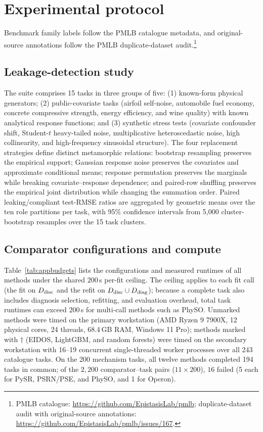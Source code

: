 \section{Experimental protocol}\label{app:protocol}

Benchmark family labels follow the PMLB catalogue metadata, and original-source annotations follow the PMLB duplicate-dataset audit.\footnote{PMLB catalogue: \url{https://github.com/EpistasisLab/pmlb}; duplicate-dataset audit with original-source annotations: \url{https://github.com/EpistasisLab/pmlb/issues/167}.}

\subsection{Leakage-detection study}\label{app:leakage}

The suite comprises 15 tasks in three groups of five: (1) known-form physical generators; (2) public-covariate tasks (airfoil self-noise, automobile fuel economy, concrete compressive strength, energy efficiency, and wine quality) with known analytical response functions; and (3) synthetic stress tests (covariate confounder shift, Student-\(t\) heavy-tailed noise, multiplicative heteroscedastic noise, high collinearity, and high-frequency sinusoidal structure). The four replacement strategies define distinct metamorphic relations: bootstrap resampling preserves the empirical support; Gaussian response noise preserves the covariates and approximate conditional means; response permutation preserves the marginals while breaking covariate--response dependence; and paired-row shuffling preserves the empirical joint distribution while changing the summation order. Paired leaking/compliant test-RMSE ratios are aggregated by geometric means over the ten role partitions per task, with 95\% confidence intervals from 5{,}000 cluster-bootstrap resamples over the 15 task clusters.

\subsection{Comparator configurations and compute}\label{app:comparators}

Table~\ref{tab:appbudgets} lists the configurations and measured runtimes of all methods under the shared \(200\)\,s per-fit ceiling. The ceiling applies to each fit call (the fit on \(D_{\rm disc}\) and the refit on \(D_{\rm disc}\cup D_{\rm diag}\)); because a complete task also includes diagnosis selection, refitting, and evaluation overhead, total task runtimes can exceed \(200\)\,s for multi-call methods such as PhySO. Unmarked methods were timed on the primary workstation (AMD Ryzen 9 7900X, 12 physical cores, 24 threads, 68.4\,GB RAM, Windows 11 Pro); methods marked with \(\dagger\) (EIDOS, LightGBM, and random forests) were timed on the secondary workstation with 16--19 concurrent single-threaded worker processes over all 243 catalogue tasks. On the 200 mechanism tasks, all twelve methods completed 194 tasks in common; of the \(2{,}200\) comparator--task pairs (\(11\times 200\)), \(16\) failed (5 each for PySR, PSRN/PSE, and PhySO, and 1 for Operon).

